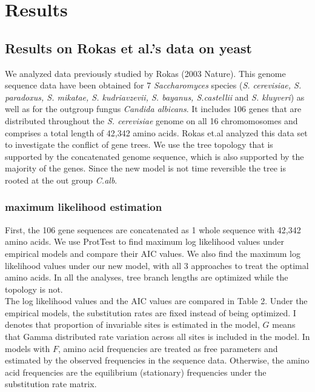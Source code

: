 \documentclass[13pt]{article}
\begin{document}
\section{Results}


\subsection{Results on Rokas et al.'s data on yeast}
We analyzed data previously studied by Rokas (2003 Nature). This genome sequence data have been obtained for 7 {\it Saccharomyces} species ({\it S. cerevisiae, S. paradoxus, S. mikatae, S. kudriavzevii, S. bayanus, S.castellii} and {\it S. kluyveri}) as well as for the outgroup fungus {\it Candida albicans}. It includes 106 genes that are distributed throughout the {\it S. cerevisiae} genome on all 16 chromomosomes and comprises a total length of 42,342 amino acids. Rokas et.al analyzed this data set to investigate the conflict of gene trees. We use the tree topology that is supported by the concatenated genome sequence, which is also supported by the majority of the genes. Since the new model is not time reversible the tree is rooted at the out group {\it C.alb}.\\

\subsubsection{maximum likelihood estimation}
First, the 106 gene sequences are concatenated as 1 whole sequence with 42,342 amino acids. We use ProtTest to find maximum log likelihood values under empirical models and compare their AIC values. We also find the maximum log likelihood values under our new model, with all 3 approaches to treat the optimal amino acids. In all the analyses, tree branch lengths are optimized while the topology is not. \\

The log likelihood values and the AIC values are compared in Table 2. Under the empirical models, the substitution rates are fixed instead of being optimized. I denotes that proportion of invariable sites is estimated in the model, $G$ means that Gamma distributed rate variation across all sites is included in the model. In models with $F$, amino acid frequencies are treated as free parameters and estimated by the observed frequencies in the sequence data. Otherwise, the amino acid frequencies are the equilibrium (stationary) frequencies under the substitution rate matrix.\\
\end{document}
